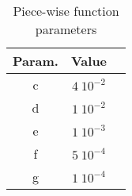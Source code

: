 \begin{table}[h!]
    \caption{Piece-wise function parameters}
    \label{tab:piece-wise}
    \centering
    \begin{tabular}{c|c|l}
        \textbf{Param.} & \textbf{Value} \\%
        \hline
        c                   & $4\ 10^{-2}$  \\   %
        d       & $1\ 10^{-2}$  \\   %
        e         & $1\ 10^{-3}$ \\%
        f        & $5\ 10^{-4}$ \\%
        g    & $1\ 10^{-4}$ \\%
    \end{tabular}
\end{table}